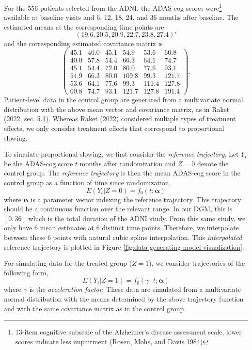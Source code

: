 \documentclass[
]{article}
\begin{document}
For the 556 patients selected from the ADNI,
the ADAS-cog scores were\footnote{13-item cognitive subscale of the Alzheimer's disease assessment scale,
  lower scores indicate less impairment (Rosen, Mohs, and Davis 1984)} available at baseline visits and 6, 12, 18, 24, and 36
months after baseline. The estimated means at the corresponding time points are
\[(19.6, 20.5, 20.9, 22.7, 23.8, 27.4)'\]
and the corresponding estimated covariance matrix is
\[\begin{pmatrix}
45.1 & 40.0 & 45.1 & 54.9 & 53.6 & 60.8 \\
40.0 & 57.8 & 54.4 & 66.3 & 64.1 & 74.7 \\
45.1 & 54.4 & 72.0 & 80.0 & 77.6 & 93.1 \\
54.9 & 66.3 & 80.0 & 109.8 & 99.3 & 121.7 \\
53.6 & 64.1 & 77.6 & 99.3 & 111.4 & 127.8 \\
60.8 & 74.7 & 93.1 & 121.7 & 127.8 & 191.4
\end{pmatrix}.\]
Patient-level data in the control group are generated from a multivariate normal
distribution with the above mean vector and covariance matrix, as in
Raket (2022, sec. 5.1). Whereas Raket (2022) considered
multiple types of treatment effects, we only consider treatment effects that
correspond to proportional slowing.

To simulate proportional slowing, we first consider the \emph{reference trajectory}.
Let \(Y_t\) be the ADAS-cog score \(t\) months after randomization and \(Z = 0\)
denote the control group. The \emph{reference trajectory} is then the mean ADAS-cog
score in the control group as a function of time since randomization, \[E(Y_{t}
| Z = 0) = f_{0}(t; \boldsymbol{\alpha})\] where \(\boldsymbol{\alpha}\) is a
parameter vector indexing the reference trajectory. This trajectory should be a
continuous function over the relevant range. In our DGM, this is \([0, 36]\) which
is the total duration of the ADNI study. From this same study, we only have 6
mean estimates at 6 distinct time points. Therefore, we interpolate between
these 6 points with natural cubic spline interpolation. This \emph{interpolated}
reference trajectory is plotted in Figure
\ref{fig:data-generating-model-visualization}.

For simulating data for the treated group (\(Z = 1\)), we consider trajectories of the
following form, \[E(Y_t | Z = 1) = f_0(\gamma \cdot t; \boldsymbol{\alpha}) \]
where \(\gamma\) is the \emph{acceleration factor}. These data are simulated from
a multivariate normal distribution with the means determined by the above
trajectory function and with the same covariance matrix as in the control group.
\end{document}
